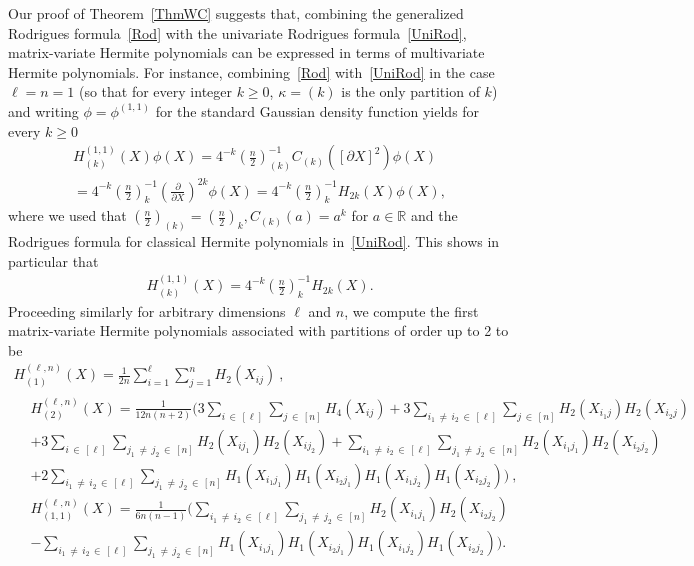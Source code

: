 \documentclass[10pt]{amsart}
\theoremstyle{definition}\newtheorem{defi}[theo]{Definition}\newtheorem{rema}[theo]{Remark}\newtheorem{exam}[theo]{Example}\newtheorem{exem}[theo]{Example}\newtheorem{nota}[theo]{Notation}
\newcommand{\R}{\mathbb{R}}
\begin{document}
Our proof of Theorem~\ref{ThmWC} suggests that, combining the generalized Rodrigues formula~\eqref{Rod} with the univariate Rodrigues formula~\eqref{UniRod}, matrix-variate Hermite polynomials can be expressed in terms of multivariate Hermite polynomials. For instance, combining~\eqref{Rod} with~\eqref{UniRod} in the case $\ell=n=1$ (so that for every integer $k\geq0$, $\kappa=(k)$ is the only partition of $k$) and writing $\phi=\phi^{(1,1)}$ for the standard Gaussian density function yields for every $k\geq 0$
\begin{multline*}
H_{(k)}^{(1,1)}(X) \phi(X) = 4^{-k} \left(\frac{n}{2}\right)_{(k)}^{-1} C_{(k)}\left([\partial X]^2\right)\phi(X)\\
= 4^{-k} \left(\frac{n}{2}\right)_{k}^{-1}
\left(\frac{\partial}{\partial X}\right)^{2k} \phi(X) =4^{-k} \left(\frac{n}{2}\right)_{k}^{-1} H_{2k}(X)\phi(X),
\end{multline*}
where we used that $(\frac{n}{2})_{(k)}=(\frac{n}{2})_{k}, C_{(k)}(a) = a^k$ for $a\in \R$ and the Rodrigues formula for classical Hermite polynomials in~\eqref{UniRod}. This shows in particular that
\begin{gather*}
H_{(k)}^{(1,1)}(X) = 4^{-k} \left(\frac{n}{2}\right)_{k}^{-1} H_{2k}(X).
\end{gather*}
Proceeding similarly for arbitrary dimensions $\ell$ and $n$, we compute the first matrix-variate Hermite polynomials associated with partitions of order up to 2 to be
\begin{multline}\label{HerPol}
 H_{(1)}^{(\ell,n)}(X) = \frac{1}{2n}\sum_{i=1}^{\ell} \sum_{j=1}^{n} H_2(X_{ij}) \ , \\
\begin{aligned}
& H_{(2)}^{(\ell,n)}(X) = \frac{1}{12n(n+2)}
\bigg(3\sum_{i\,\in\,[\ell]}\sum_{j\,\in\,[n]} H_4\left(X_{ij}\right)
 + 3\sum_{i_1\,\neq\,i_2\,\in\,[\ell]} \sum_{j\,\in\,[n]} H_2\left(X_{i_1j}\right) H_2\left(X_{i_2j}\right)\\
&+3\sum_{i\,\in\,[\ell]} \sum_{j_1\,\neq\,j_2\,\in\,[n]} H_2\left(X_{ij_1}\right) H_2\left(X_{ij_2}\right) + \sum_{i_1\,\neq\,i_2\,\in\,[\ell]} \sum_{j_1\,\neq\,j_2\,\in\,[n]} H_2\left(X_{i_1j_1}\right) H_2\left(X_{i_2j_2}\right)\\
&+ 2\sum_{i_1\,\neq\,i_2\,\in\,[\ell]} \sum_{j_1\,\neq\,j_2\,\in\,[n]} H_1\left(X_{i_1j_1}\right) H_1\left(X_{i_2j_1}\right) H_1\left(X_{i_1j_2}\right) H_1\left(X_{i_2j_2}\right) \bigg) \ , \\
&H_{(1,1)}^{(\ell,n)}(X) = \frac{1}{6n(n-1)}\bigg(
\sum_{i_1\,\neq\,i_2\,\in\,[\ell]} \sum_{j_1\,\neq\,j_2\,\in\,[n]} H_2\left(X_{i_1j_1}\right)H_2\left(X_{i_2j_2}\right)\\
& - \sum_{i_1\,\neq\,i_2\,\in\,[\ell]}
\sum_{j_1\,\neq\,j_2\,\in\,[n]} H_1\left(X_{i_1j_1}\right) H_1\left(X_{i_2j_1}\right) H_1\left(X_{i_1j_2}\right) H_1\left(X_{i_2j_2}\right) \bigg). 
\end{aligned}
\end{multline}
\end{document}

